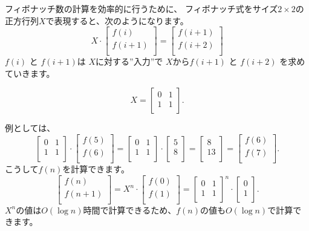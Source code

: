 \begin{samepage}
フィボナッチ数の計算を効率的に行うために、
フィボナッチ式をサイズ$2 \times 2$の 正方行列$X$で表現すると、次のようになります。
\[ X \cdot
 \begin{bmatrix}
  f(i) \\
  f(i+1) \\
 \end{bmatrix}
=
 \begin{bmatrix}
  f(i+1) \\
  f(i+2) \\
 \end{bmatrix}
 \]
$f(i)$ と $f(i+1)$は
 $X$に対する''入力''で
$X$から$f(i+1)$ と $f(i+2)$
を求めていきます。

\[ X =
 \begin{bmatrix}
  0 & 1 \\
  1 & 1 \\
 \end{bmatrix}.
\]
\end{samepage}
\noindent
例としては、
\[
 \begin{bmatrix}
  0 & 1 \\
  1 & 1 \\
 \end{bmatrix}
\cdot
 \begin{bmatrix}
  f(5) \\
  f(6) \\
 \end{bmatrix}
=
 \begin{bmatrix}
  0 & 1 \\
  1 & 1 \\
 \end{bmatrix}
\cdot
 \begin{bmatrix}
  5 \\
  8 \\
 \end{bmatrix}
=
 \begin{bmatrix}
  8 \\
  13 \\
 \end{bmatrix}
=
 \begin{bmatrix}
  f(6) \\
  f(7) \\
 \end{bmatrix}.
\]
こうして$f(n)$を計算できます。
\[
 \begin{bmatrix}
  f(n) \\
  f(n+1) \\
 \end{bmatrix}
=
X^n \cdot
 \begin{bmatrix}
  f(0) \\
  f(1) \\
 \end{bmatrix}
=
 \begin{bmatrix}
  0 & 1 \\
  1 & 1 \\
 \end{bmatrix}^n
\cdot
 \begin{bmatrix}
  0 \\
  1 \\
 \end{bmatrix}.
\]
$X^n$の値は$O(\log n)$時間で計算できるため、$f(n)$の値も$O(\log n)$で計算できます。

